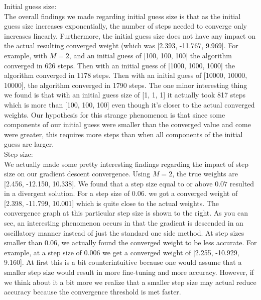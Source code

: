 \documentclass{article}
\begin{document}
Initial guess size:\\
The overall findings we made regarding initial guess size is that as the initial guess size increases exponentially, the number of steps needed to converge only increases linearly. Furthermore, the initial guess size does not have any impact on the actual resulting converged weight (which was  [2.393, -11.767, 9.969]. For example, with $M = 2$, and an initial guess of [100, 100, 100] the algorithm converged in 626 steps. Then with an initial guess of [1000, 1000, 1000] the algorithm converged in 1178 steps. Then with an initial guess of [10000, 10000, 10000], the algorithm converged in 1790 steps. The one minor interesting thing we found is that with an initial guess size of [1, 1, 1]  it actually took 817 steps which is more than [100, 100, 100] even though it's closer to the actual converged weights. Our hypothesis for this strange phenomenon is that since some components of our initial guess were smaller than the converged value and come were greater, this requires more steps than when all components of the initial guess are larger.\\

Step size: \\
We actually made some pretty interesting findings regarding the impact of step size on our gradient descent convergence. Using $M = 2$, the true weights are [2.456, -12.150, 10.338]. We found that a step size equal to or above $0.07$ resulted in a divergent solution. For a step size of $0.06$. we got a converged weight of [2.398, -11.799, 10.001] which is quite close to the actual weights. The convergence graph at this particular step size is shown to the right. As you can see, an interesting phenomenon occurs in that the gradient is descended in an oscillatory manner instead of just the standard one side method. At step sizes smaller than $0.06$, we actually found the converged weight to be less accurate. For example, at a step size of $0.006$ we get a converged weight of [2.255, -10.929, 9.160]. At first this is a bit counterintuitive because one would assume that a smaller step size would result in more fine-tuning and more accuracy. However, if we think about it a bit more we realize that a smaller step size may actual reduce accuracy because the convergence threshold is met faster.\\
\end{document}
